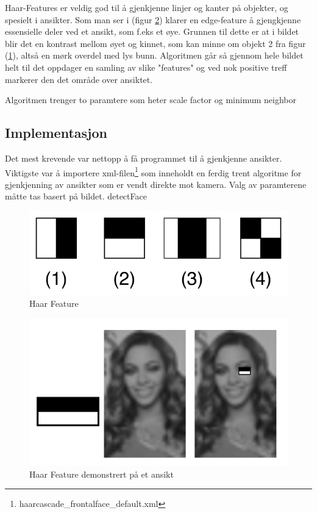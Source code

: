 Haar-Features er veldig god til å gjenkjenne linjer og kanter på objekter, og spesielt i ansikter. Som man ser i (figur \ref{fig:haarface}) klarer en edge-feature å gjengkjenne essensielle deler ved et ansikt, som f.eks et øye. Grunnen til dette er at i bildet blir det en kontrast mellom øyet og kinnet, som kan minne om objekt 2 fra figur (\ref{fig:haarfeat}), altså en mørk overdel med lys bunn. Algoritmen går så gjennom hele bildet helt til det oppdager en samling av slike "features" og ved nok positive treff markerer den det område over ansiktet.

Algoritmen trenger to paramtere som heter scale factor og minimum neighbor

\subsection{Implementasjon}
Det mest krevende var nettopp å få programmet til å gjenkjenne ansikter. Viktigste var å importere xml-filen\footnote{haarcascade\_frontalface\_default.xml\cite{xml:haar}} som inneholdt en ferdig trent algoritme for gjenkjenning av ansikter som er vendt direkte mot kamera. Valg av paramterene måtte tas basert på bildet.
{detectFace}

\begin{figure}
\begin{center}
    \includegraphics[width=0.4\columnwidth]{bilder/Anonymisering/VJ_featureTypes.svg.png}
     \caption{Haar Feature\label{fig:haarfeat}} 
\end{center}
\end{figure}

\begin{figure}
\begin{center}
    \includegraphics[width=0.5\columnwidth]{bilder/Anonymisering/haarface-example.png}
     \caption{Haar Feature demonstrert på et ansikt \label{fig:haarface}} 
\end{center}
\end{figure}
 
